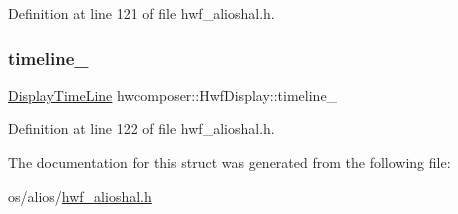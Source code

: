Definition at line 121 of file hwf\+\_\+alioshal.\+h.

\mbox{\label{structhwcomposer_1_1HwfDisplay_acf9eacafe04e405a33c36eeb5219a02a}} 
\subsubsection{\texorpdfstring{timeline\+\_\+}{timeline\_}}
{\footnotesize\ttfamily \mbox{\hyperlink{classhwcomposer_1_1DisplayTimeLine}{Display\+Time\+Line}} hwcomposer\+::\+Hwf\+Display\+::timeline\+\_\+}



Definition at line 122 of file hwf\+\_\+alioshal.\+h.



The documentation for this struct was generated from the following file\+:\begin{DoxyCompactItemize}
\item 
os/alios/\mbox{\hyperlink{hwf__alioshal_8h}{hwf\+\_\+alioshal.\+h}}\end{DoxyCompactItemize}
